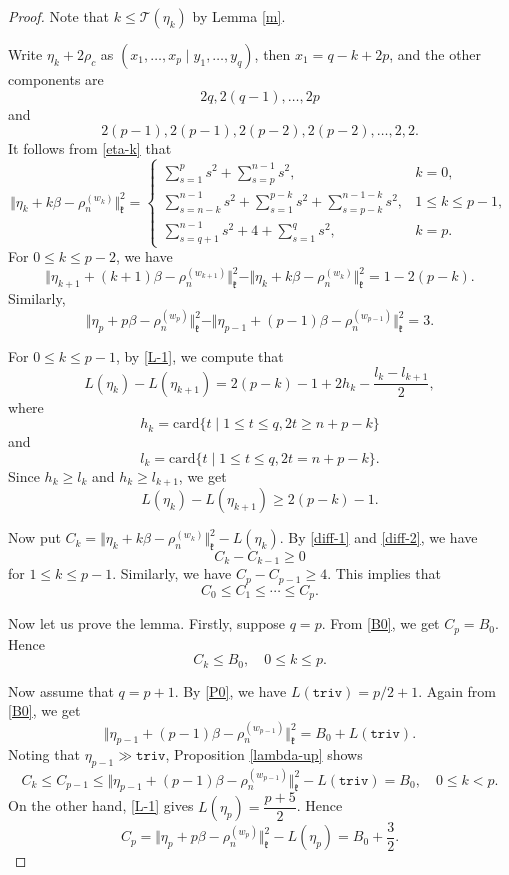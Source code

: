 \documentclass[11pt]{amsart}
\theoremstyle{plain}
\theoremstyle{definition}
\newcommand{\frk}{\mathfrak{k}}
\newcommand{\caT}{\mathcal{T}}
\begin{document}
\begin{proof}
Note that $k\le \caT(\eta_k)$ by Lemma \ref{m}.


Write $\eta_k+2\rho_c$ as $(x_1, \dots, x_p\mid y_1, \dots, y_q)$, then $x_1=q-k+2p$, and the other components are
$$2q, 2(q-1), \dots, 2p$$
and
$$
2(p-1), 2(p-1), 2(p-2), 2(p-2), \dots, 2, 2.
$$
It follows from \eqref{eta-k} that
\[\Vert\eta_k+k\beta-\rho_n^{(w_k)}\Vert_\frk^2=\left\{
\begin{array}{ll}
	\sum\limits_{s=1}^ps^2+\sum\limits_{s=p}^{n-1}s^2,& k=0,\\
	\sum\limits_{s=n-k}^{n-1}s^2+\sum\limits_{s=1}^{p-k}s^2+\sum\limits_{s=p-k}^{n-1-k}s^2, & 1\le k\le p-1,\\
	\sum\limits_{s=q+1}^{n-1}s^2+4+\sum\limits_{s=1}^{q}s^2, &k=p.
\end{array}
\right.\]
For $0\le k\le p-2$, we have	
\begin{equation}\label{diff-1}
\Vert\eta_{k+1}+(k+1)\beta-\rho_n^{(w_{k+1})}\Vert_\frk^2-\Vert\eta_k+k\beta-\rho_n^{(w_k)}\Vert_\frk^2
=1-2(p-k).
\end{equation}
Similarly,
$$
\Vert\eta_p+ p\beta-\rho_n^{(w_p)}\Vert_\frk^2-
\Vert\eta_{p-1}+(p-1)\beta-\rho_n^{(w_{p-1})}\Vert_\frk^2=3.
$$


 For $0\le k\le p-1$, by \eqref{L-1}, we compute that
\[L(\eta_k)-L(\eta_{k+1})=2(p-k)-1+2h_k-\dfrac{l_k-l_{k+1}}{2},\]
where
$$
h_k=\mathrm{card}\{t\mid 1\le t\le q, 2t\ge n+p-k\}
$$
and
$$
l_k=\mathrm{card}\{t\mid 1\le t\le q, 2t=n+p-k\}.
$$
	Since $h_k\ge l_k$ and $h_k\ge l_{k+1}$, we get
\begin{equation}\label{diff-2}
L(\eta_k)-L(\eta_{k+1})\ge 2(p-k)-1.
\end{equation}

	

Now put $C_k=\Vert\eta_k+k\beta-\rho_n^{(w_k)}\Vert_\frk^2-L(\eta_k)$.   By \eqref{diff-1} and \eqref{diff-2}, we have
\[C_k-C_{k-1}\ge 0\]
for $1\leq k\leq p-1$. Similarly, we have $C_p-C_{p-1}\ge 4$.
This implies that
		\[C_0\le C_1\le\cdots\le C_p.\]



	
	Now let us prove the lemma.
Firstly, suppose $q=p$. From \eqref{B0}, we get $C_p=B_0$. Hence
\[C_k\le B_0,\quad 0\le k\le p.\]
	
Now assume that $q=p+1$. By \eqref{P0}, we have $L(\texttt{triv})=p/2+1$. Again from \eqref{B0}, we get
$$
\Vert\eta_{p-1}+(p-1)\beta-\rho_n^{(w_{p-1})}\Vert_\frk^2=B_0+L(\texttt{triv}).
$$
Noting that $\eta_{p-1}\gg\texttt{triv}$, Proposition \ref{lambda-up} shows
	\[C_k\le C_{p-1}\leq \Vert\eta_{p-1}+(p-1)\beta-\rho_n^{(w_{p-1})}\Vert_\frk^2-L(\texttt{triv})=B_0,\quad 0\le k<p.\]
	On the other hand, \eqref{L-1} gives $L(\eta_p)=\dfrac{p+5}{2}$. Hence
	\[C_p=\Vert\eta_p+p\beta-\rho_n^{(w_p)}\Vert_\frk^2-L(\eta_p)=B_0+\dfrac{3}{2}.\]
	

\end{proof}
\end{document}
